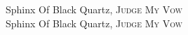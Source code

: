    Sphinx Of Black Quartz, {\scshape Judge My Vow} \\
   Sphinx Of Black Quartz, {\scshape Judge My Vow}
